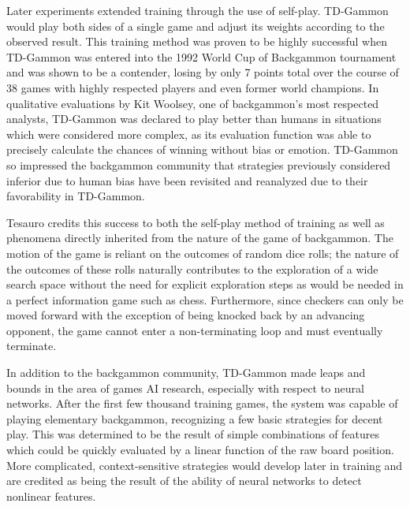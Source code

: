 Later experiments extended training through the use of self-play.
%
TD-Gammon would play both sides of a single game and adjust its
weights according to the observed result.
%
This training method was proven to be highly successful when TD-Gammon was
entered into the 1992 World Cup of Backgammon tournament and was shown to be a
contender,
losing by only 7 points total over the course of 38 games with highly respected
players and even former world champions.
%
In qualitative evaluations by Kit Woolsey,
one of backgammon's most respected analysts,
TD-Gammon was declared to play better than humans in situations which were
considered more complex,
as its evaluation function was able to precisely
calculate the chances of winning without bias or emotion.
%
TD-Gammon so impressed the backgammon community that strategies previously
considered inferior due to human bias have been revisited and reanalyzed due to
their favorability in TD-Gammon.

Tesauro credits this success to both the self-play method of training
as well as phenomena directly inherited from the nature of the game of
backgammon.
%
The motion of the game is reliant on the outcomes of random dice rolls;
the nature of the outcomes of these rolls naturally contributes to the
exploration of a wide search space without the need for explicit exploration
steps as would be needed in a perfect information game such as chess.
%
Furthermore,
since checkers can only be moved forward
with the exception of being knocked back by an advancing opponent,
the game cannot enter a non-terminating loop and must eventually
terminate.

In addition to the backgammon community,
TD-Gammon made leaps and bounds in the area of games AI research,
especially with respect to neural networks.
%
After the first few thousand training games,
the system was capable of playing elementary backgammon,
recognizing a few basic strategies for decent play.
%
This was determined to be the result of simple combinations of features which
could be quickly evaluated by a linear function of the raw board position.
%
More complicated, context-sensitive strategies would develop later in training
and are credited as being the result of the ability of neural networks to detect
nonlinear features.



